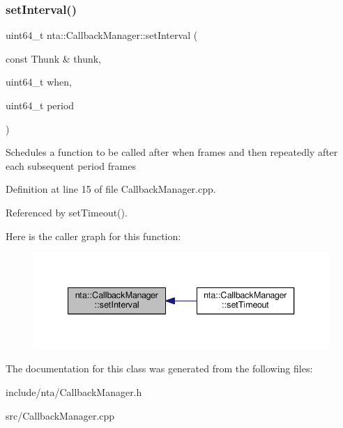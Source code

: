 \subsubsection{\texorpdfstring{set\+Interval()}{setInterval()}}
{\footnotesize\ttfamily uint64\+\_\+t nta\+::\+Callback\+Manager\+::set\+Interval (\begin{DoxyParamCaption}\item[{const Thunk \&}]{thunk,  }\item[{uint64\+\_\+t}]{when,  }\item[{uint64\+\_\+t}]{period }\end{DoxyParamCaption})\hspace{0.3cm}{\ttfamily [static]}}

Schedules a function to be called after when frames and then repeatedly after each subsequent period frames 

Definition at line 15 of file Callback\+Manager.\+cpp.



Referenced by set\+Timeout().

Here is the caller graph for this function\+:\nopagebreak
\begin{figure}[H]
\begin{center}
\leavevmode
\includegraphics[width=340pt]{d1/de6/classnta_1_1CallbackManager_a1fd6132e79e49dbcb787bc8a8507a931_icgraph}
\end{center}
\end{figure}


The documentation for this class was generated from the following files\+:\begin{DoxyCompactItemize}
\item 
include/nta/Callback\+Manager.\+h\item 
src/Callback\+Manager.\+cpp\end{DoxyCompactItemize}
